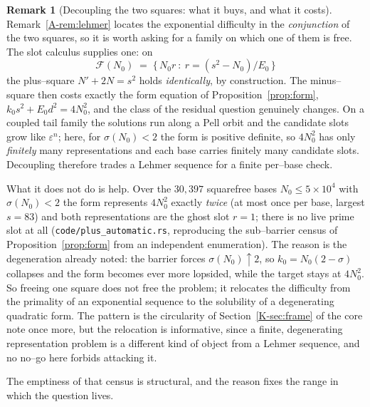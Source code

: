 \documentclass[11pt]{article}
\theoremstyle{definition}
\newtheorem{remark}[theorem]{Remark}
\begin{document}
\begin{remark}[Decoupling the two squares: what it buys, and what it costs]\label{rem:decouple}
Remark~\ref{A-rem:lehmer} locates the exponential difficulty in the \emph{conjunction} of the two
squares, so it is worth asking for a family on which one of them is free. The slot calculus supplies
one: on
\[ \mathcal F(N_0)\;=\;\bigl\{\,N_0r\ :\ r=(s^2-N_0)/E_0\,\bigr\} \]
the plus--square $N'+2N=s^2$ holds \emph{identically}, by construction. The minus--square then costs
exactly the form equation of Proposition~\ref{prop:form}, $k_0s^2+E_0d^2=4N_0^2$, and the class of
the residual question genuinely changes. On a coupled tail family the solutions run along a Pell
orbit and the candidate slots grow like $\varepsilon^n$; here, for $\sigma(N_0)<2$ the form is
positive definite, so $4N_0^2$ has only \emph{finitely} many representations and each base carries
finitely many candidate slots. Decoupling therefore trades a Lehmer sequence for a finite
per--base check.

What it does not do is help. Over the $30{,}397$ squarefree bases $N_0\le5\times10^4$ with
$\sigma(N_0)<2$ the form represents $4N_0^2$ exactly \emph{twice} (at most once per base, largest
$s=83$) and both representations are the ghost slot $r=1$; there is no live prime slot at all
(\texttt{code/plus\_automatic.rs}, reproducing the sub--barrier census of
Proposition~\ref{prop:form} from an independent enumeration). The reason is the degeneration already
noted: the barrier forces $\sigma(N_0)\uparrow2$, so $k_0=N_0(2-\sigma)$ collapses and the form
becomes ever more lopsided, while the target stays at $4N_0^2$. So freeing one square does not free
the problem; it relocates the difficulty from the primality of an exponential sequence to the
solubility of a degenerating quadratic form. The pattern is the circularity of
Section~\ref{K-sec:frame} of the core note once more, but the relocation is informative, since a finite, degenerating
representation problem is a different kind of object from a Lehmer sequence, and no no--go here
forbids attacking it.
\end{remark}

The emptiness of that census is structural, and the reason fixes the range in which the question
lives.
\end{document}
